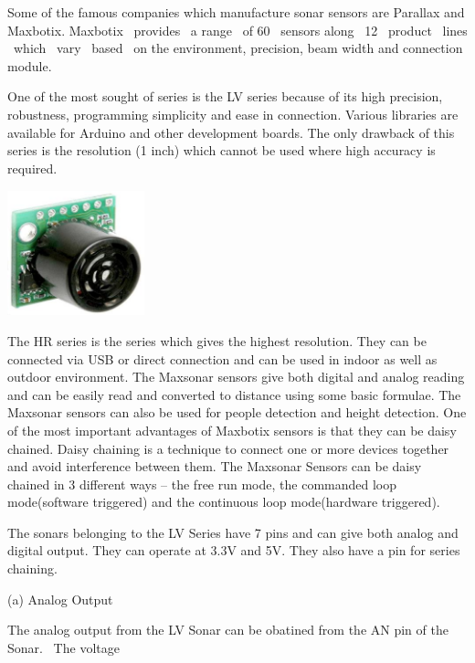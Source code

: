 \documentclass[11pt]{report}
\begin{document}
{Some of the famous companies which manufacture sonar sensors are
Parallax and Maxbotix. Maxbotix \ provides \ a range \ of 60 \ sensors
along \ 12 \ product \ lines \ which \ vary \ based \ on the
environment, precision, beam width and connection module.


\bigskip

{
One of the most sought of series is the LV series because of its high
precision, robustness, programming simplicity and ease in connection.
Various libraries are available for Arduino and other development
boards. The only drawback of this series is the resolution (1 inch)
which cannot be used where high accuracy is required.}


\bigskip

 \includegraphics[width=3.969cm,height=3.625cm]{III-img2.png} 


{
The HR series is the series which gives the highest resolution. They can
be connected via USB or direct connection and can be used in indoor as
well as outdoor environment. The Maxsonar sensors give both digital and
analog reading and can be easily read and converted to distance using
some basic formulae. The Maxsonar sensors can also be used for people
detection and height detection. One of the most important advantages of
Maxbotix sensors is that they can be daisy chained. Daisy chaining is a
technique to connect one or more devices together and avoid
interference between them. The Maxsonar Sensors can be daisy chained in
3 different ways {}-- the free run mode, the commanded loop
mode(software triggered) and the continuous loop mode(hardware
triggered).}


\bigskip

{
The sonars belonging to the LV Series have 7 pins and can give both
analog and digital output. They can operate at 3.3V and 5V. They also
have a pin for series chaining.}


\bigskip

{
(a) Analog Output}

{
The analog output from the LV Sonar can be obatined from the AN pin of
the Sonar. \ The voltage}

}
\end{document}

